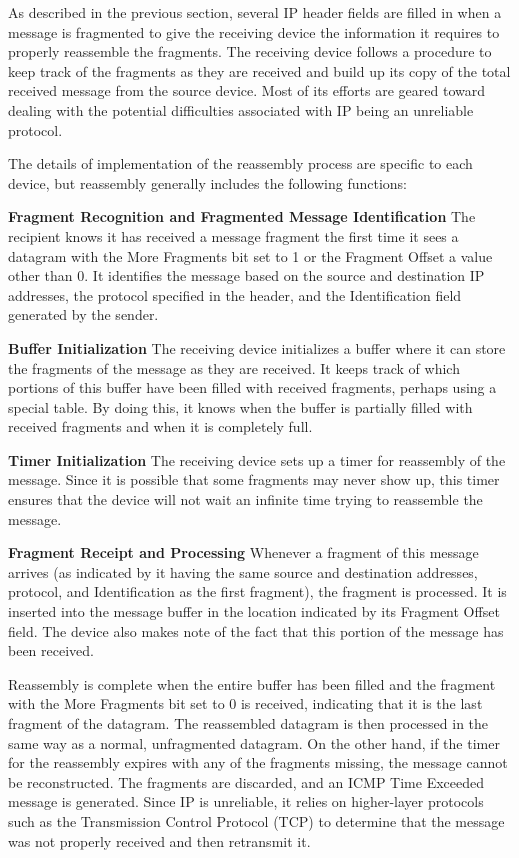 As described in the previous section, several IP header fields are
filled in when a message is fragmented to give the receiving device the
information it requires to properly reassemble the fragments. The
receiving device follows a procedure to keep track of the fragments as
they are received and build up its copy of the total received message
from the source device. Most of its efforts are geared toward dealing
with the potential difficulties associated with IP being an unreliable
protocol.

The details of implementation of the reassembly process are specific to
each device, but reassembly generally includes the following functions:

{\textbf{Fragment Recognition and Fragmented Message Identification}}
The recipient knows it has received a message fragment the first time it
sees a datagram with the More Fragments bit set to 1 or the Fragment
Offset a value other than 0. It identifies the message based on the
source and destination IP addresses, the protocol specified in the
header, and the Identification field generated by the sender.

{\textbf{Buffer Initialization}} The receiving device initializes a
buffer where it can store the fragments of the message as they are
received. It keeps track of which portions of this buffer have been
filled with received fragments, perhaps using a special table. By doing
this, it knows when the buffer is partially filled with received
fragments and when it is completely full.

{\textbf{Timer Initialization}} The receiving device sets up a timer for
reassembly of the message. Since it is possible that some fragments may
never show up, this timer ensures that the device will not wait an
infinite time trying to reassemble the message.

{\textbf{Fragment Receipt and Processing}} Whenever a fragment of this
message arrives (as indicated by it having the same source and
destination addresses, protocol, and Identification as the first
fragment), the fragment is processed. It is inserted into the message
buffer in the location indicated by its Fragment Offset field. The
device also makes note of the fact that this portion of the message has
been received.

Reassembly is complete when the entire buffer has been filled and the
fragment with the More Fragments bit set to 0 is received, indicating
that it is the last fragment of the datagram. The reassembled datagram
is then processed in the same way as a normal, unfragmented datagram. On
the other hand, if the timer for the reassembly expires with any of the
fragments missing, the message cannot be reconstructed. The fragments
are discarded, and an ICMP Time Exceeded message is generated. Since IP
is unreliable, it relies on higher-layer protocols such as the
Transmission Control Protocol (TCP) to determine that the message was
not properly received and then retransmit it.

